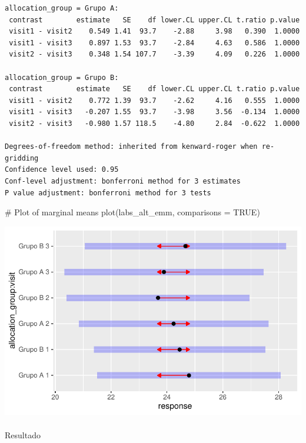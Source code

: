 \documentclass[
  12pt,
]{article}
\makeatletter
\let\oldparagraph\paragraph
\renewcommand{\paragraph}{
    \@ifstar
      \xxxParagraphStar
      \xxxParagraphNoStar
  }
\newcommand{\xxxParagraphStar}[1]{\oldparagraph*{#1}\mbox{}}
\newcommand{\xxxParagraphNoStar}[1]{\oldparagraph{#1}\mbox{}}
\newenvironment{Shaded}{\begin{snugshade}}{\end{snugshade}}
\newcommand{\AttributeTok}[1]{\textcolor[rgb]{0.40,0.45,0.13}{#1}}
\newcommand{\CommentTok}[1]{\textcolor[rgb]{0.37,0.37,0.37}{#1}}
\newcommand{\ConstantTok}[1]{\textcolor[rgb]{0.56,0.35,0.01}{#1}}
\newcommand{\FunctionTok}[1]{\textcolor[rgb]{0.28,0.35,0.67}{#1}}
\newcommand{\NormalTok}[1]{\textcolor[rgb]{0.00,0.23,0.31}{#1}}
\makeatother
\begin{document}
\begin{verbatim}
allocation_group = Grupo A:
 contrast        estimate   SE    df lower.CL upper.CL t.ratio p.value
 visit1 - visit2    0.549 1.41  93.7    -2.88     3.98   0.390  1.0000
 visit1 - visit3    0.897 1.53  93.7    -2.84     4.63   0.586  1.0000
 visit2 - visit3    0.348 1.54 107.7    -3.39     4.09   0.226  1.0000

allocation_group = Grupo B:
 contrast        estimate   SE    df lower.CL upper.CL t.ratio p.value
 visit1 - visit2    0.772 1.39  93.7    -2.62     4.16   0.555  1.0000
 visit1 - visit3   -0.207 1.55  93.7    -3.98     3.56  -0.134  1.0000
 visit2 - visit3   -0.980 1.57 118.5    -4.80     2.84  -0.622  1.0000

Degrees-of-freedom method: inherited from kenward-roger when re-gridding 
Confidence level used: 0.95 
Conf-level adjustment: bonferroni method for 3 estimates 
P value adjustment: bonferroni method for 3 tests 
\end{verbatim}

\begin{Shaded}
\begin{Highlighting}[]
\CommentTok{\# Plot of marginal means}
\FunctionTok{plot}\NormalTok{(labs\_alt\_emm, }\AttributeTok{comparisons =} \ConstantTok{TRUE}\NormalTok{)}
\end{Highlighting}
\end{Shaded}

\includegraphics{Outcomes_files/figure-pdf/labs_alt_sens_emm-1.pdf}

\paragraph{Resultado}\label{resultado-1}
\end{document}
